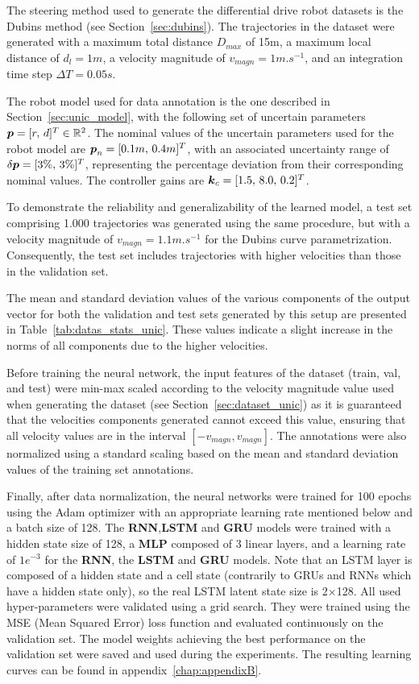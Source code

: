 The steering method used to generate the differential drive robot datasets is the Dubins method (see Section~\ref{sec:dubins}).
The trajectories in the dataset were generated with a maximum total distance $D_{max}$ of 15m, a maximum local distance of $d_l = 1m$, a velocity magnitude of $v_{magn} = 1 m.s^{-1}$, and an integration time step $\Delta T = 0.05s$. 

The robot model used for data annotation is the one described in Section~\ref{sec:unic_model}, with the following set of uncertain parameters $\boldsymbol{p} = [r, \, d]^T \in \mathbb{R}^{2}$.
The nominal values of the uncertain parameters used for the robot model are  $\boldsymbol{p}_n = [0.1m, \, 0.4m]^T$, with an associated uncertainty range of $\delta\boldsymbol{p} = [3\%, \, 3\%]^T$, representing the percentage deviation from their corresponding nominal values.
The controller gains are $\boldsymbol{k}_c = [1.5, \, 8.0, \, 0.2]^T$.

To demonstrate the reliability and generalizability of the learned model, a test set comprising 1.000 trajectories was generated using the same procedure, but with a velocity magnitude of $v_{magn} = 1.1 m.s^{-1}$ for the Dubins curve parametrization. 
Consequently, the test set includes trajectories with higher velocities than those in the validation set.

The mean and standard deviation values of the various components of the output vector for both the validation and test sets generated by this setup are presented in Table~\ref{tab:datas_stats_unic}. 
These values indicate a slight increase in the norms of all components due to the higher velocities.

Before training the neural network, the input features of the dataset (train, val, and test) were min-max scaled according to the velocity magnitude value used when generating the dataset (see Section~\ref{sec:dataset_unic}) as it is guaranteed that the velocities components generated cannot exceed this value, ensuring that all velocity values are in the interval $[-v_{magn}, v_{magn}]$.  
The annotations were also normalized using a standard scaling based on the mean and standard deviation values of the training set annotations.

Finally, after data normalization, the neural networks were trained for 100 epochs using the Adam optimizer \cite{kingma2014adam} with an appropriate learning rate mentioned below and a batch size of 128. 
The \textbf{RNN},\textbf{LSTM} and \textbf{GRU} models were trained with a hidden state size of 128, a \textbf{MLP} composed of 3 linear layers, and a learning rate of $1e^{-3}$ for the \textbf{RNN}, the \textbf{LSTM} and \textbf{GRU} models.
Note that an LSTM layer is composed of a hidden state and a cell state (contrarily to GRUs and RNNs which have a hidden state only), so the real LSTM latent state size is 2$\times$128.
All used hyper-parameters were validated using a grid search.
They were trained using the MSE (Mean Squared Error) loss function and evaluated continuously on the validation set. 
The model weights achieving the best performance on the validation set were saved and used during the experiments.
The resulting learning curves can be found in appendix~\ref{chap:appendixB}.

